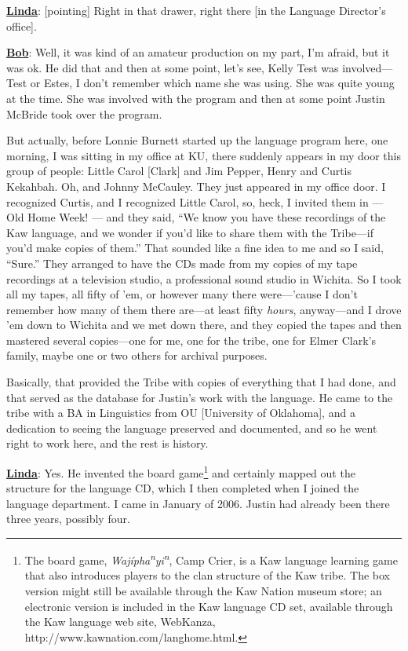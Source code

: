 \documentclass[output=paper]{LSP/langsci}
\begin{document}
\textbf{\underline{Linda}}: [pointing] Right in that drawer, right there [in the Language Director's office].

\textbf{\underline{Bob}}: Well, it was kind of an amateur production on my part, I'm afraid, but it was ok. He did that and then at some point, let's see, Kelly Test was involved---Test or Estes, I don't remember which name she was using. She was quite young at the time. She was involved with the program and then at some point Justin McBride took over the program. 

But actually, before Lonnie Burnett started up the language program here, one morning, I was sitting in my office at KU, there suddenly appears in my door this group of people: Little Carol [Clark] and Jim Pepper, Henry and Curtis Kekahbah. Oh, and Johnny McCauley. They just appeared in my office door. I recognized Curtis, and I recognized Little Carol, so, heck, I invited them in --- Old Home Week! --- and they said, ``We know you have these recordings of the Kaw language, and we wonder if you'd like to share them with the Tribe---if you'd make copies of them.'' That sounded like a fine idea to me and so I said, ``Sure.'' They arranged to have the CDs made from my copies of my tape recordings at a television studio, a professional sound studio in Wichita. So I took all my tapes, all fifty of 'em, or however many there were---'cause I don't remember how many of them there are---at least fifty \textit{hours}, anyway---and I drove 'em down to Wichita and we met down there, and they copied the tapes and then mastered several copies---one for me, one for the tribe, one for Elmer Clark's family, maybe one or two others for archival purposes. 

Basically, that provided the Tribe with copies of everything that I had done, and that served as the database for Justin's work with the language. He came to the tribe with a BA in Linguistics from OU [University of Oklahoma], and a dedication to seeing the language preserved and documented, and so he went right to work here, and the rest is history.

\textbf{\underline{Linda}}: Yes. He invented the board game\footnote{The board game, \textit{Waj\'ipha\textsuperscript{n}yi\textsuperscript{n}}, Camp Crier, is a Kaw language learning game that also introduces players to the clan structure of the Kaw tribe. The box version might still be available through the Kaw Nation museum store; an electronic version is included in the Kaw language CD set, available through the Kaw language web site, WebKanza, {http://www.kawnation.com/langhome.html}.} and certainly mapped out the structure for the language CD, which I then completed when I joined the language department. I came in January of 2006. Justin had already been there three years, possibly four.
\end{document}
